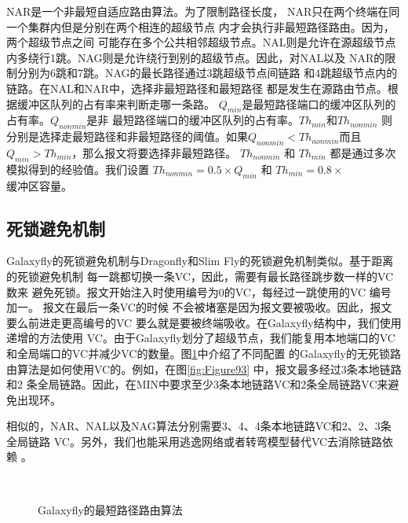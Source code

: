 NAR是一个非最短自适应路由算法。为了限制路径长度，
NAR只在两个终端在同一个集群内但是分别在两个相连的超级节点
内才会执行非最短路径路由。因为，两个超级节点之间
可能存在多个公共相邻超级节点。NAL则是允许在源超级节点
内多绕行1跳。NAG则是允许绕行到别的超级节点。因此，对NAL以及
NAR的限制分别为6跳和7跳。NAG的最长路径通过3跳超级节点间链路
和4跳超级节点内的链路。在NAL和NAR中，选择非最短路径和最短路径
都是发生在源路由节点。根据缓冲区队列的占有率来判断走哪一条路。
$Q_{min}$是最短路径端口的缓冲区队列的占有率。$Q_{nonmin}$是非
最短路径端口的缓冲区队列的占有率。$Th_{min}$和$Th_{nonmin}$ 则
分别是选择走最短路径和非最短路径的阈值。如果$Q_{nonmin}<Th_{nonmin}$而且
$Q_{min}>Th_{min}$，那么报文将要选择非最短路径。 $Th_{nonmin}$ 和 $Th_{min}$ 都是通过多次模拟得到的经验值。我们设置
$Th_{nonmin}=0.5\times Q_{min}$ 和 $Th_{min}=0.8\times$ $缓冲区容量$。

\subsection{死锁避免机制}

Galaxyfly的死锁避免机制与Dragonfly和Slim Fly的死锁避免机制类似。基于距离的死锁避免机制
每一跳都切换一条VC，因此，需要有最长路径跳步数一样的VC数来
避免死锁。报文开始注入时使用编号为0的VC，每经过一跳使用的VC
编号加一。 报文在最后一条VC的时候
不会被堵塞是因为报文要被吸收。因此，报文要么前进走更高编号的VC
要么就是要被终端吸收。在Galaxyfly结构中，我们使用递增的方法使用
VC。由于Galaxyfly划分了超级节点，我们能复用本地端口的VC
和全局端口的VC并减少VC的数量。图\ref{fig:Figure9}中介绍了不同配置
的Galaxyfly的无死锁路由算法是如何使用VC的。例如，在图\ref{fig:Figure93}
中，报文最多经过3条本地链路和2 条全局链路。因此，在MIN中要求至少3条本地链路VC和2条全局链路VC来避免出现环。

相似的，NAR、NAL以及NAG算法分别需要3、4、4条本地链路VC和2、2、3条全局链路
VC。另外，我们也能采用逃逸网络或者转弯模型替代VC去消除链路依赖
。

\begin{figure}[t]
  \centering
   \begin{minipage}[t]{\textwidth}
   \centering
  \\
  \caption{Galaxyfly的最短路径路由算法}
  \label{fig:Figure9}
  \end{minipage}
\end{figure}

